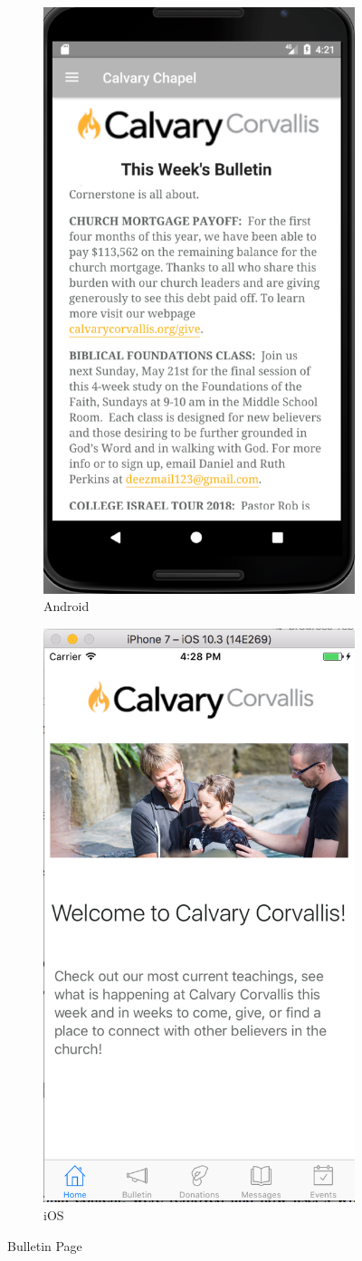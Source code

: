 \documentclass[letterpaper,10pt,draftclsnofoot,onecolumn,titlepage]{IEEEtran}
\begin{document}
		\begin{figure}[H]
			\centering
			\begin{subfigure}{.5\textwidth}
 				 \centering
  				 \includegraphics[width=.4\linewidth]{androidbulletin}
 				 \caption{Android}
  				 \label{fig:sub1}
			\end{subfigure}%
			\begin{subfigure}{.5\textwidth}
		         	\centering
 				 \includegraphics[width=.4\linewidth]{iosbulletin}
 				 \caption{iOS}
 				 \label{fig:sub2}
			\end{subfigure}
			\caption{Bulletin Page}
			\label{fig:bulletin}
		\end{figure}

		
		
\end{document}
